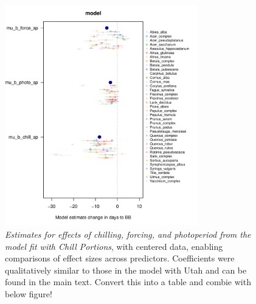 \documentclass{article}
\begin{document}
\begin{figure}[h!]
\centering
\noindent \includegraphics[width=0.75\textwidth]{..//..//analyses/bb_analysis/figures/muplotmodelspcompexprampfpcp_z.pdf}
\caption{\emph{Estimates for effects of chilling, forcing, and photoperiod from the model fit with Chill Portions}, with centered data, enabling comparisons of effect sizes across predictors. Coefficients were qualitatively similar to those in the model with Utah and can be found in the main text. Convert this into a table and combie with below figure!} 
\label{fig:mucpz}
\end{figure}
\end{document}
